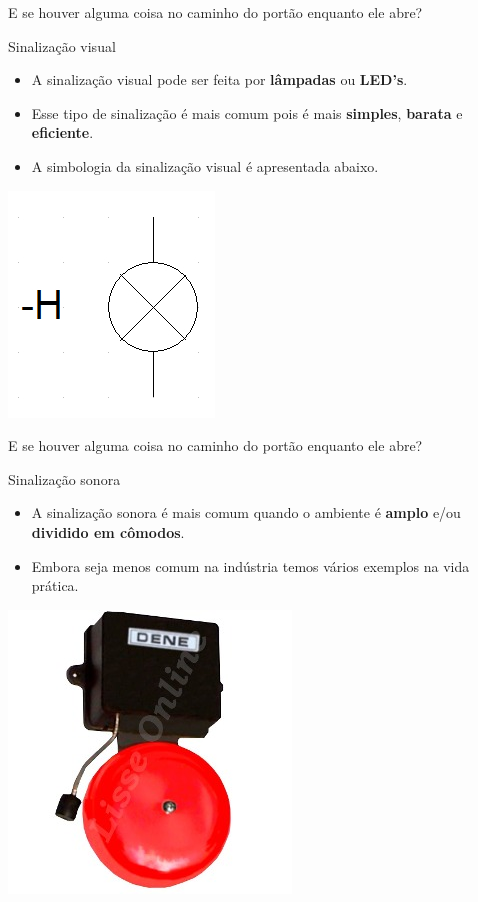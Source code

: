\begin{frame}{E se houver alguma coisa no caminho do portão enquanto ele abre?}
	\begin{block}{Sinalização visual}
		\begin{itemize}
			\item A sinalização visual pode ser feita por \textbf{lâmpadas} ou \textbf{LED's}.
			\item Esse tipo de sinalização é mais comum pois é mais \textbf{simples}, \textbf{barata} e \textbf{eficiente}.
			\item A simbologia da sinalização visual é apresentada abaixo.
		\end{itemize}
	\end{block}
	\centerline{\includegraphics[width=0.3\linewidth]{Figuras/Ch05/fig18.jpg}}
\end{frame}


\begin{frame}{E se houver alguma coisa no caminho do portão enquanto ele abre?}
	\begin{block}{Sinalização sonora}
		\begin{itemize}
			\item A sinalização sonora é mais comum quando o ambiente é \textbf{amplo} e/ou \textbf{dividido em cômodos}.
			\item Embora seja menos comum na indústria temos vários exemplos na vida prática.
		\end{itemize}
	\end{block}
	\centerline{\includegraphics[width=0.4\linewidth]{Figuras/Ch05/fig19.jpg}}
\end{frame}


